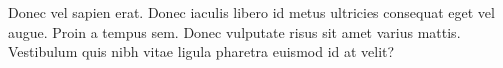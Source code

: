 	\question
	 Donec vel sapien erat. Donec iaculis libero id metus ultricies consequat eget vel augue. Proin a 
	 tempus sem. Donec vulputate risus sit amet varius mattis. Vestibulum quis nibh vitae ligula 
	 pharetra euismod id at velit?
\begin{solution}
	\lipsum[1-2]
\end{solution}